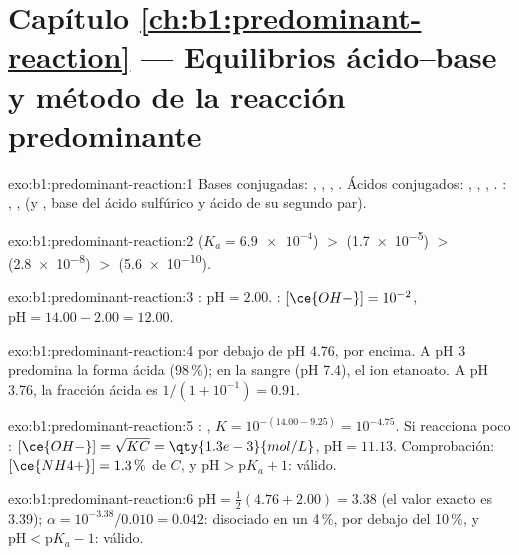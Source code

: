 \section*{Capítulo \ref{ch:b1:predominant-reaction} --- Equilibrios ácido--base y método de la reacción predominante}

\begin{solution}{exo:b1:predominant-reaction:1}
Bases conjugadas: , , , . Ácidos
conjugados: , , , . :
, ,  (y , base del ácido
sulfúrico y ácido de su segundo par).
\end{solution}

\begin{solution}{exo:b1:predominant-reaction:2}
 ($K_a = \num{6.9e-4}$) $>$  (\num{1.7e-5}) $>$ 
(\num{2.8e-8}) $>$  (\num{5.6e-10}).
\end{solution}

\begin{solution}{exo:b1:predominant-reaction:3}
: $\mathrm{pH} = 2.00$. : $[\ce{OH-}] = 10^{-2}$,
$\mathrm{pH} = 14.00 - 2.00 = 12.00$.
\end{solution}

\begin{solution}{exo:b1:predominant-reaction:4}
 por debajo de pH 4.76,  por encima. A pH 3
predomina la forma ácida (98\,\%); en la sangre (pH 7.4), el ion
etanoato. A pH 3.76, la fracción ácida es $1/(1 + 10^{-1}) = 0.91$.
\end{solution}

\begin{solution}{exo:b1:predominant-reaction:5}
: , $K = 10^{-(14.00 -
9.25)} = 10^{-4.75}$. Si reacciona poco : $[\ce{OH-}] = \sqrt{K C} =
\qty{1.3e-3}{mol/L}$, $\mathrm{pH} = 11.13$. Comprobación: $[\ce{NH4+}] = 1.3\,\%$
de $C$, y $\mathrm{pH} > \mathrm{p}K_a + 1$: válido.
\end{solution}

\begin{solution}{exo:b1:predominant-reaction:6}
$\mathrm{pH} = \frac12(4.76 + 2.00) = 3.38$ (el valor exacto es 3.39);
$\alpha = 10^{-3.38}/0.010 = 0.042$: disociado en un 4\,\%, por debajo
del 10\,\%, y $\mathrm{pH} < \mathrm{p}K_a - 1$: válido.
\end{solution}

